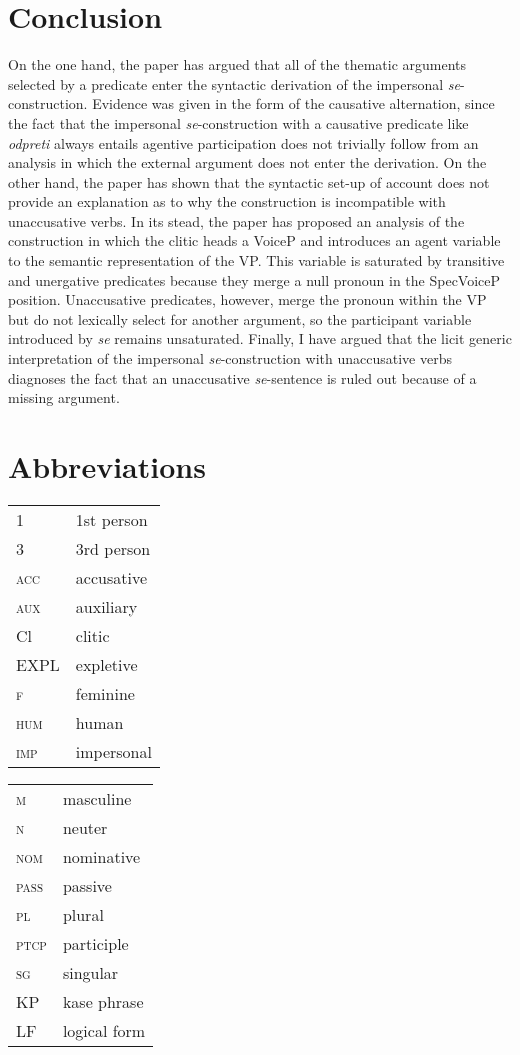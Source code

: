 \documentclass[output=paper,
modfonts,nonflat,
newtxmath
]{langsci/langscibook}
\begin{document}
\section{Conclusion} \label{sec5}
On the one hand, the paper has argued that all of the thematic arguments selected by a predicate enter the syntactic derivation of the impersonal \textit{se}-construction. Evidence was given in the form of the causative alternation, since the fact that the impersonal \textit{se}-construction with a causative predicate like \textit{odpreti} always entails agentive participation does not trivially follow from an analysis in which the external argument does not enter the derivation. On the other hand, the paper has shown that the syntactic set-up of  account does not provide an explanation as to why the construction is incompatible with unaccusative verbs. In its stead, the paper has proposed an analysis of the construction in which the clitic heads a VoiceP and introduces an agent variable to the semantic representation of the VP. This variable is saturated by transitive and unergative predicates because they merge a null pronoun in the SpecVoiceP position. Unaccusative predicates, however, merge the pronoun within the VP but do not lexically select for another argument, so the participant variable introduced by \textit{se} remains unsaturated. Finally, I have argued that the licit generic interpretation of the impersonal \textit{se}-construction with unaccusative verbs diagnoses the fact that an unaccusative \textit{se}-sentence is ruled out because of a missing argument.


\section*{Abbreviations}
\begin{tabularx}{.45\textwidth}{lX}
\textsc{1}&1st person\\
\textsc{3}&3rd person\\
\textsc{acc}&accusative\\
\textsc{aux}&auxiliary\\
Cl&clitic\\
EXPL&expletive\\
\textsc{f}&feminine\\
\textsc{hum}&human\\
\textsc{imp}&impersonal\\
\end{tabularx}
\begin{tabularx}{.45\textwidth}{lX}
\textsc{m}&masculine\\
\textsc{n}&neuter\\
\textsc{nom}&nominative\\
\textsc{pass}&passive\\
\textsc{pl}&plural\\
\textsc{ptcp}&participle\\
\textsc{sg}&singular\\
KP&kase phrase\\
LF& logical form\\
\end{tabularx}
\end{document}
